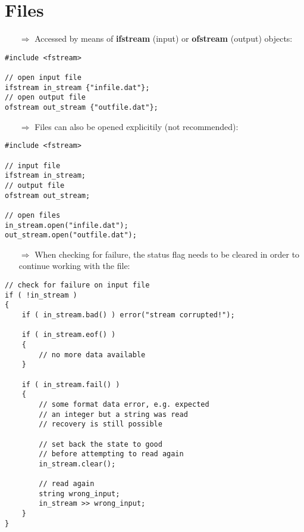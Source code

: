 \documentclass[10pt]{article}
\begin{document}
\section{Files}
\small
\begin{enumerate}
\item[$\Rightarrow$] Accessed by means of \textbf{ifstream} (input) or
\textbf{ofstream} (output) objects:
\end{enumerate}
\begin{lstlisting}
#include <fstream>

// open input file 
ifstream in_stream {"infile.dat"};
// open output file
ofstream out_stream {"outfile.dat"};
\end{lstlisting}
\begin{enumerate}
\item[$\Rightarrow$] Files can also be opened explicitily (not recommended):
\end{enumerate}
\begin{lstlisting}
#include <fstream>

// input file 
ifstream in_stream;
// output file
ofstream out_stream;

// open files
in_stream.open("infile.dat");
out_stream.open("outfile.dat");
\end{lstlisting}
\begin{enumerate}
\item[$\Rightarrow$] When checking for failure, the status flag needs to be cleared
in order to continue working with the file:
\end{enumerate}
\begin{lstlisting}
// check for failure on input file
if ( !in_stream )
{
    if ( in_stream.bad() ) error("stream corrupted!");
    
    if ( in_stream.eof() )
    { 
        // no more data available
    }
    
    if ( in_stream.fail() )
    {
        // some format data error, e.g. expected
        // an integer but a string was read
        // recovery is still possible
        
        // set back the state to good 
        // before attempting to read again
        in_stream.clear();
        
        // read again
        string wrong_input;
        in_stream >> wrong_input;
    }
}
\end{lstlisting}
\end{document}

